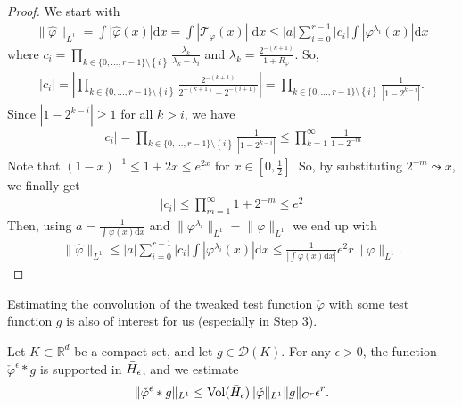 \begin{proof}
    We start with 
    \begin{align*}
        \lVert \hat \varphi \rVert_{L^1} = \int |\hat \varphi(x)| \mathrm{d}x = \int |\mathcal{T}_{\varphi}(x)| \; \mathrm{d}x \leq |a| \sum^{r-1}_{i=0} |c_i| \int |\varphi^{\lambda_i}(x)| \mathrm{d}x
    \end{align*}
    where \(c_i = \prod_{k \in \{0,\ldots,r-1\} \setminus\left\{ i \right\} } \frac{\lambda_k}{\lambda_k - \lambda_i}\) and \(\lambda_k = \frac{2^{-(k+1)}}{1+R_\varphi}\). So, 
    \begin{align*}
        |c_i| = \left|\prod_{k \in \{0,\ldots,r-1\} \setminus\left\{ i \right\} } \frac{2^{-(k+1)}}{2^{-(k+1)} - 2^{-(i+1)}}\right| = \prod_{k \in \{0,\ldots,r-1\} \setminus\left\{ i \right\} } \frac{1}{|1 - 2^{k - i}|}.
    \end{align*} 
    Since \(|1 - 2^{k - i}| \geq 1\) for all \(k > i\), we have   
    \begin{align*}
        |c_i| = \prod_{k \in \{0,\ldots,r-1\} \setminus\left\{ i \right\} } \frac{1}{|1 - 2^{k - i}|} \leq \prod^\infty_{k=1} \frac{1}{1 - 2^{-m}}
    \end{align*}
    Note that \((1-x)^{-1} \leq 1 + 2x \leq e^{2x}\) for \(x \in [0,\frac{1}{2}]\). So, by substituting \(2^{-m} \leadsto x\), we finally get 
    \begin{align}\label{jsknfjkewfwhiru}
        |c_i| \leq \prod^\infty_{m=1} 1 + 2^{-m} \leq e^2
    \end{align}
    Then, using \(a = \frac{1}{\int \varphi(x)\mathrm{d}x}\) and \( \lVert \varphi^{\lambda_i} \rVert_{L^1} =  \lVert \varphi \rVert_{L^1} \)  we end up with 
    \begin{align*}
        \lVert \hat \varphi \rVert_{L^1} \leq |a| \sum^{r-1}_{i=0} |c_i| \int |\varphi^{\lambda_i}(x)| \mathrm{d}x \leq \frac{1}{|\int \varphi(x) \mathrm{d}x|} e^2r \lVert \varphi \rVert_{L^1}.
    \end{align*}
\end{proof}

Estimating the convolution of the tweaked test function \(\check \varphi\) with some test function \(g\) is also of interest for us (especially in Step 3). 

\begin{lemma}\label{step3:lemma}
    Let \(K \subset \mathbb{R}^d\) be a compact set, and let \(g \in \mathcal{D}(K)\). For any \(\epsilon > 0\), the function \(\check \varphi^\epsilon * g\) is supported in \(\bar{H}_{\epsilon}\), and we estimate     
    \begin{align*}
        \lVert \check \varphi^{\epsilon} * g \rVert_{L^1} \leq \mathrm{Vol}(\bar{H}_{\epsilon})  \lVert \check \varphi \rVert_{L^1} \lVert g \rVert_{C^r} \epsilon^r.
    \end{align*}
\end{lemma}

